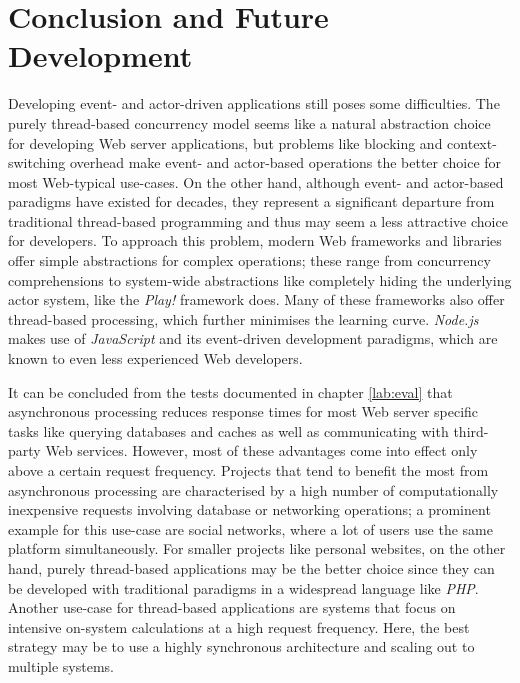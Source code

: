 \chapter{Conclusion and Future Development}
Developing event- and actor-driven applications still poses some difficulties. The purely thread-based concurrency model seems like a natural abstraction choice for developing Web server applications, but problems like blocking and context-switching overhead make event- and actor-based operations the better choice for most Web-typical use-cases. On the other hand, although event- and actor-based paradigms have existed for decades, they represent a significant departure from traditional thread-based programming and thus may seem a less attractive choice for developers. To approach this problem, modern Web frameworks and libraries offer simple abstractions for complex operations; these range from concurrency comprehensions to system-wide abstractions like completely hiding the underlying actor system, like the \textit{Play!} framework does. Many of these frameworks also offer thread-based processing, which further minimises the learning curve. \textit{Node.js} makes use of \textit{JavaScript} and its event-driven development paradigms, which are known to even less experienced Web developers.

It can be concluded from the tests documented in chapter \ref{lab:eval} that asynchronous processing reduces response times for most Web server specific tasks like querying databases and caches as well as communicating with third-party Web services. However, most of these advantages come into effect only above a certain request frequency. Projects that tend to benefit the most from asynchronous processing are characterised by a high number of computationally inexpensive requests involving database or networking operations; a prominent example for this use-case are social networks, where a lot of users use the same platform simultaneously. For smaller projects like personal websites, on the other hand, purely thread-based applications may be the better choice since they can be developed with traditional paradigms in a widespread language like \textit{PHP}. Another use-case for thread-based applications are systems that focus on intensive on-system calculations at a high request frequency. Here, the best strategy may be to use a highly synchronous architecture and scaling out to multiple systems. 

